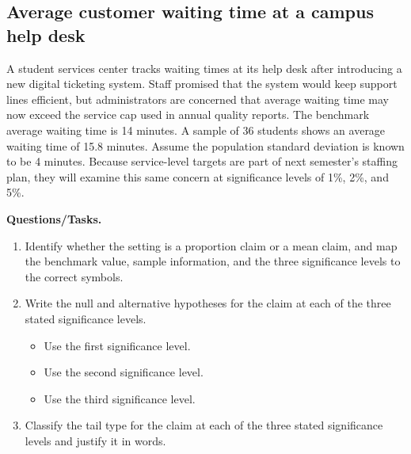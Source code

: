 \begin{ExamProblems}
		\item
		\section{Average customer waiting time at a campus help desk}
		A student services center tracks waiting times at its help desk after introducing a new digital ticketing system. Staff promised that the system would keep support lines efficient, but administrators are concerned that average waiting time may now exceed the service cap used in annual quality reports. The benchmark average waiting time is 14 minutes. A sample of 36 students shows an average waiting time of 15.8 minutes. Assume the population standard deviation is known to be 4 minutes. Because service-level targets are part of next semester's staffing plan, they will examine this same concern at significance levels of 1\%, 2\%, and 5\%.
		
		\textbf{Questions/Tasks.}
		\begin{enumerate}
			\item[(C1)] Identify whether the setting is a proportion claim or a mean claim, and map the benchmark value, sample information, and the three significance levels to the correct symbols.
			\item[(C2)] Write the null and alternative hypotheses for the claim at each of the three stated significance levels.
			\begin{itemize}
				\item[(a)] Use the first significance level.
				\item[(b)] Use the second significance level.
				\item[(c)] Use the third significance level.
			\end{itemize}
			\item[(C3)] Classify the tail type for the claim at each of the three stated significance levels and justify it in words.
		\end{enumerate}
		

\end{ExamProblems}
